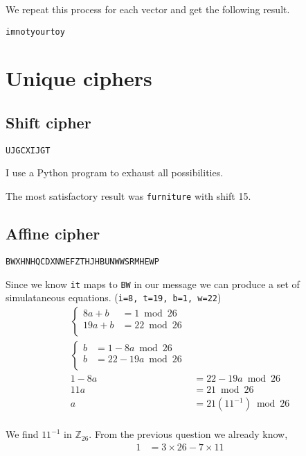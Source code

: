 \documentclass{article}
\begin{document}
We repeat this process for each vector and get the following result.
\begin{verbatim}
imnotyourtoy
\end{verbatim}

\section{Unique ciphers}
\subsection{Shift cipher}
\begin{verbatim}
UJGCXIJGT
\end{verbatim}

I use a Python program to exhaust all possibilities.


The most satisfactory result was \texttt{furniture} with shift 15.

\subsection{Affine cipher}
\begin{verbatim}
BWXHNHQCDXNWEFZTHJHBUNWWSRMHEWP
\end{verbatim}

Since we know \texttt{it} maps to \texttt{BW} in our message we can produce
a set of simulataneous equations. (\texttt{i=8, t=19, b=1, w=22})
\begin{align*}
    \begin{cases}
        8a + b &= 1 \bmod 26 \\
        19a + b &= 22 \bmod 26 \\
    \end{cases} \\
    \begin{cases}
        b &= 1 - 8a \bmod 26 \\
        b &= 22 - 19a \bmod 26 \\
    \end{cases} \\
    1 - 8a &= 22 - 19a \bmod 26 \\
    11a &= 21 \bmod 26 \\
    a &= 21(11^{-1}) \bmod 26 \\
\end{align*}

We find $11^{-1}$ in $\mathbb{Z}_{26}$. From the previous question we already
know,
\begin{align*}
    1 &= 3\times26 - 7\times11 \\
\end{align*}
\end{document}
